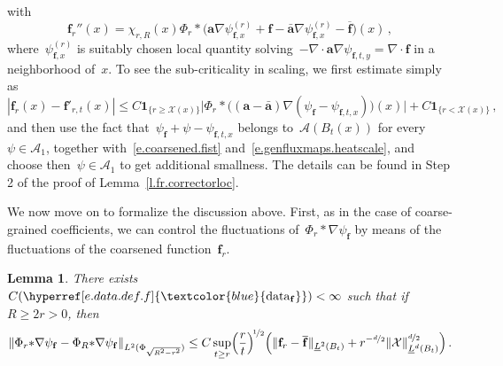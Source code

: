 \documentclass[11pt,twoside]{article} %
\numberwithin{equation}{section}
\newtheorem{lemma}[theorem]{Lemma}
\theoremstyle{definition}
\newcommand{\datareff}{\hyperref[e.data.def.f]{\textcolor{blue}{\ensuremath{\mathrm{data}_{\mathbf{f}}}}}}
\let\originalleft\left
\let\originalright\right
\renewcommand{\left}{\mathopen{}\mathclose\bgroup\originalleft}
\renewcommand{\right}{\aftergroup\egroup\originalright}
\newcommand{\f}{\mathbf{f}}
\renewcommand{\a}{\mathbf{a}}
\newcommand{\ahom}{\bar{\a}}
\newcommand{\X}{\mathcal{X}}
\newcommand{\indc}{\boldsymbol{1}}
\newcommand{\minscale}{\chi}
\newcommand{\A}{\mathcal{A}}
\begin{document}
with 
\begin{equation*}  
\f_r''(x) = \minscale_{r,R}(x) \Phi_r \ast  \bigl( \a \nabla \psi_{\f,x}^{(r)}  + \f - \ahom \nabla \psi_{\f,x}^{(r)} - \overline{\f}  \bigr) (x)  \,,
\end{equation*}
where~$\psi_{\f,x}^{(r)}$ is suitably chosen local quantity solving~$-\nabla \cdot \a \nabla \psi_{\f,t,y} = \nabla \cdot \f$ in a neighborhood of~$x$. To see the sub-criticality in scaling, we first estimate simply as
\begin{equation} \label{e.fvsfloc.pre}
| \f_r(x) - \f'_{r,t}(x) | 
\leq  
C \indc_{\{r \geq \X(x)\}} \Big| \Phi_r \ast  \bigl(  (\a - \ahom) \nabla(\psi_{\f} -  \psi_{\f,t,x}) \bigr)(x) \Big| 
+ 
C  \indc_{\{r < \X(x)\}}
\,,
\end{equation}
and then use the fact that~$\psi_{\f} + \psi - \psi_{\f,t,x}$ belongs to~$\A(B_t(x))$ for every~$\psi \in \A_1$, together with~\eqref{e.coarsened.fist} and~\eqref{e.genfluxmaps.heatscale}, and choose then~$\psi \in \A_1$ to get additional smallness. The details can be found in Step 2 of the proof of Lemma~\ref{l.fr.correctorloc}. 


\smallskip

We now move on to formalize the discussion above. First, as in the case of coarse-grained coefficients, we can control the fluctuations of~$\Phi_r \ast \nabla \psi_{\f}$ by means of the fluctuations of the coarsened function~$\f_r$. 


\begin{lemma} \label{l.fr.frtopsi}
There exists~$C(\datareff)<\infty$ such that if~$R \geq 2r > 0$, then 
\begin{equation}  \label{e.fr.frtopsi}
\left\| \Phi_r {\ast}  \nabla \psi_{\f}  - \Phi_R {\ast} \nabla \psi_{\f}  \right\|_{L^2 ( \Phi_{\sqrt{R^2-r^2}})}
\leq 
C \sup_{t \geq r} \Bigl( \frac{r}{t} \Bigr)^{\!\nicefrac12}  \Bigl( \| \f_r - \overline{\f} \|_{\underline{L}^2 \left( B_{t} \right)} 
+ 
 r^{-\nicefrac d2}  \| \X \|_{\underline{L}^d \left( B_{t} \right)}^{\nicefrac d2} \Bigr)
\,.
\end{equation}
\end{lemma}
\end{document}
